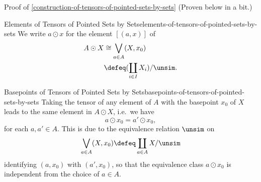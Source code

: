 \begin{Proof}{Proof of \cref{construction-of-tensors-of-pointed-sets-by-sets}}%
    (Proven below in a bit.)
\end{Proof}
\begin{notation}{Elements of Tensors of Pointed Sets by Sets}{elements-of-tensors-of-pointed-sets-by-sets}%
    We write $a\odot x$ for the element $[(a,x)]$ of
    \begin{align*}
        A\odot X &\cong  \bigvee_{a\in A}(X,x_{0})\\%
                 &\defeq (\coprod_{i\in I}X_{i})/\unsim.%
    \end{align*}
\end{notation}
\begin{remark}{Basepoints of Tensors of Pointed Sets by Sets}{basepoints-of-tensors-of-pointed-sets-by-sets}%
    Taking the tensor of any element of $A$ with the basepoint $x_{0}$ of $X$ leads to the same element in $A\odot X$, i.e.\ we have
    \[%
        a\odot x_{0}%
        =%
        a'\odot x_{0},%
    \]%
    for each $a,a'\in A$. This is due to the equivalence relation $\unsim$ on
    \[
        \bigvee_{a\in A}(X,x_{0})%
        \defeq%
        \coprod_{a\in A}X/\unsim%
    \]%
    identifying $(a,x_{0})$ with $(a',x_{0})$, so that the equivalence class $a\odot x_{0}$ is independent from the choice of $a\in A$.
\end{remark}
